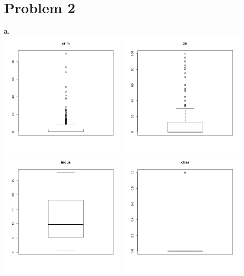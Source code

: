 \documentclass{article}
\begin{document}
\section{Problem 2}
\textbf{a.}\\
\includegraphics[width=2.5in]{1.png}
\includegraphics[width=2.5in]{2.png}
\includegraphics[width=2.5in]{3.png}
\includegraphics[width=2.5in]{4.png}
\end{document}
